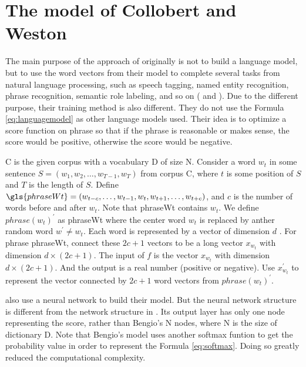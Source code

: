 
\section{The model of Collobert and Weston}

The main purpose of the approach of \cite{CollobertWeston2008} originally is not to build a language model, but to use the word vectors from their model to complete several tasks from natural language processing, such as speech tagging, named entity recognition, phrase recognition, semantic role labeling, and so on (\citep{CollobertWeston2008} and \citep{CollobertWestonEtAl2011}). Due to the different purpose, their training method is also different. They do not use the Formula \ref{eq:languagemodel} as other language models used. Their idea is to optimize a score function on phrase so that if the phrase is reasonable or makes sense, the score would be positive, otherwise the score would be negative. 

\gls{C} is the given corpus with a vocabulary \gls{D} of size \gls{N}. Consider a word $w_t$ in some sentence $S = (w_1,w_2,\ldots,w_{T-1},w_{T})$ from corpus \gls{C}, where $t$ is some position of $S$ and $T$ is the length of $S$. Define $\gls{phraseWt} = (w_{t-c},\ldots,w_{t-1},w_t,w_{t+1},\ldots,w_{t+c})$, and $c$ is the number of words before and after $w_t$. Note that \gls{phraseWt} contains $w_t$. 
We define $phrase(w_t)^\prime$ as \gls{phraseWt} where the center word $w_t$ is replaced by  anther random word $w^\prime\not=w_t$. Each word is represented by a vector of dimension $d$ . For phrase \gls{phraseWt}, connect these $2c+1$ vectors to be a long vector $x_{w_t}$ with dimension $d \times (2c+1)$. The input of $f$ is the vector $x_{w_t}$ with dimension $d \times (2c+1)$. And the output is a real number (positive or negative). Use $x^\prime_{w_t}$ to represent the vector connected by $2c+1$ word vectors from $phrase(w_t)^\prime$.

\citep{CollobertWeston2008} also use a neural network to build their model. But the neural network structure is different from the network structure in \citep{BengioDucharmeEtAl2003}. Its output layer has only one node representing the score, rather than Bengio's \gls{N} nodes, where \gls{N} is the size of dictionary \gls{D}. Note that Bengio's model uses another softmax funtion to get the probability value in order to represent the Formula \ref{eq:softmax}. Doing so greatly reduced the computational complexity.

